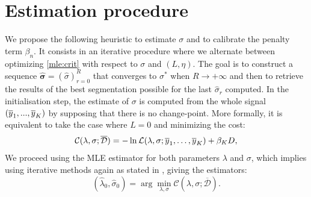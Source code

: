 \section{Estimation procedure}\label{chp:4:3}

We propose the following heuristic to estimate $\sigma$ and to calibrate the penalty term $\beta_n$. It consists in an iterative procedure where we alternate between optimizing \ref{mle:crit} with respect to $\sigma$ and $(L,\eta)$. The goal is to construct a sequence $\bm{\widehat{\sigma}} = (\widehat{\sigma})_{r=0}^R$ that converges to $\sigma^*$ when $R \to +\infty$ and then to retrieve the results of the best segmentation possible for the last $\widehat{\sigma}_r$ computed.
In the initialisation step, the estimate of $\sigma$ is computed from the whole signal $(\overline{y}_1,...,\overline{y}_K)$ by supposing that there is no change-point. More formally, it is equivalent to take the case where $L = 0$ and minimizing the cost: 
\begin{equation}\label{heu:init}
\mathcal{C}(\lambda,\sigma;   \overline{\mathcal{D}})= -\ln \mathcal L(\lambda,\sigma; \overline{y}_{1}, \ldots, \overline{y}_{K}) + \beta_K D,
\end{equation}
We proceed using the MLE estimator for both parameters $\lambda$ and $\sigma$, which implies using iterative methods again as stated in \cite{cohen1965maximum}, giving the estimators:
\begin{equation}\label{heu:sigma1}
(\widehat{\lambda}_0, \widehat{\sigma}_0) = \arg \min_{\lambda, \sigma} \mathcal{C}(\lambda, \sigma ;   \overline{\mathcal{D}}).
\end{equation}

